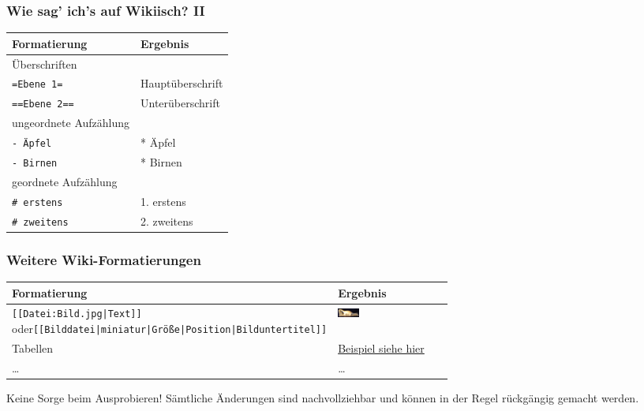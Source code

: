 \documentclass{beamer}
\begin{document}
\begin{frame}
  \frametitle{Wie sag’ ich’s auf Wikiisch? II}

  \centering
  
  \begin{tabular}{|l|l|}
    \toprule
    \textbf{Formatierung } & \textbf{Ergebnis } \\ 
    \midrule
     
    Überschriften & \\ 

    \texttt{=Ebene 1=} &  Hauptüberschrift \\ 
     
    \texttt{==Ebene 2==} &  Unterüberschrift \\ 
    \midrule
     
    ungeordnete Aufzählung & \\ 

    \texttt{- Äpfel} &  *  Äpfel \\ 
    \texttt{- Birnen} &  * Birnen \\ 

    \midrule
     
    geordnete Aufzählung & \\ 
     
    \texttt{\# erstens} &  1.  erstens \\ 
    \texttt{\# zweitens} &  2.  zweitens \\ 

    \bottomrule
  \end{tabular}
\end{frame}


\begin{frame}
  \frametitle{Weitere Wiki-Formatierungen}

  \begin{center}
    \begin{tabular}{|p{0.65\linewidth}|l|}
      \toprule
      \textbf{Formatierung} & \textbf{Ergebnis} \\ 
      \midrule
      \texttt{[[Datei:Bild.jpg|Text]]} oder\newline \texttt{[[Bilddatei|miniatur|Größe|Position|Bilduntertitel]]}  &   \includegraphics[keepaspectratio=true, width=0.2\textwidth]{rapid-dino.jpg} \\
      \midrule
      Tabellen & \href{https://de.wikipedia.org/wiki/Hilfe:Tabellen}{Beispiel siehe hier} \\ 
      \midrule
      \dots & \dots \\     
      \hline
    \end{tabular}
  \end{center}

  \bigskip
  
  Keine Sorge beim Ausprobieren! Sämtliche Änderungen sind nachvollziehbar und
  können in der Regel rückgängig gemacht werden.
\end{frame}
\end{document}
